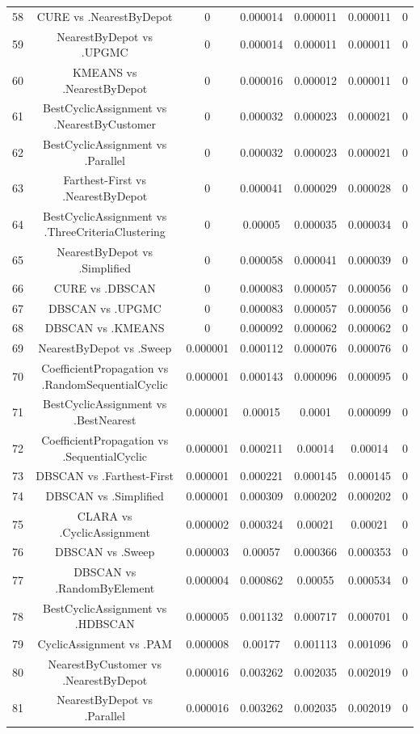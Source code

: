 \documentclass[a4paper,10pt]{article}
\begin{document}
\begin{landscape}
\begin{table}[!htp]
\begin{tabular}{ccccccc}
58&CURE vs .NearestByDepot&0&0.000014&0.000011&0.000011&0\\
59&NearestByDepot vs .UPGMC&0&0.000014&0.000011&0.000011&0\\
60&KMEANS vs .NearestByDepot&0&0.000016&0.000012&0.000011&0\\
61&BestCyclicAssignment vs .NearestByCustomer&0&0.000032&0.000023&0.000021&0\\
62&BestCyclicAssignment vs .Parallel&0&0.000032&0.000023&0.000021&0\\
63&Farthest-First vs .NearestByDepot&0&0.000041&0.000029&0.000028&0\\
64&BestCyclicAssignment vs .ThreeCriteriaClustering&0&0.00005&0.000035&0.000034&0\\
65&NearestByDepot vs .Simplified&0&0.000058&0.000041&0.000039&0\\
66&CURE vs .DBSCAN&0&0.000083&0.000057&0.000056&0\\
67&DBSCAN vs .UPGMC&0&0.000083&0.000057&0.000056&0\\
68&DBSCAN vs .KMEANS&0&0.000092&0.000062&0.000062&0\\
69&NearestByDepot vs .Sweep&0.000001&0.000112&0.000076&0.000076&0\\
70&CoefficientPropagation vs .RandomSequentialCyclic&0.000001&0.000143&0.000096&0.000095&0\\
71&BestCyclicAssignment vs .BestNearest&0.000001&0.00015&0.0001&0.000099&0\\
72&CoefficientPropagation vs .SequentialCyclic&0.000001&0.000211&0.00014&0.00014&0\\
73&DBSCAN vs .Farthest-First&0.000001&0.000221&0.000145&0.000145&0\\
74&DBSCAN vs .Simplified&0.000001&0.000309&0.000202&0.000202&0\\
75&CLARA vs .CyclicAssignment&0.000002&0.000324&0.00021&0.00021&0\\
76&DBSCAN vs .Sweep&0.000003&0.00057&0.000366&0.000353&0\\
77&DBSCAN vs .RandomByElement&0.000004&0.000862&0.00055&0.000534&0\\
78&BestCyclicAssignment vs .HDBSCAN&0.000005&0.001132&0.000717&0.000701&0\\
79&CyclicAssignment vs .PAM&0.000008&0.00177&0.001113&0.001096&0\\
80&NearestByCustomer vs .NearestByDepot&0.000016&0.003262&0.002035&0.002019&0\\
81&NearestByDepot vs .Parallel&0.000016&0.003262&0.002035&0.002019&0\\

\end{tabular}
\end{table}
\end{landscape}
\end{document}
